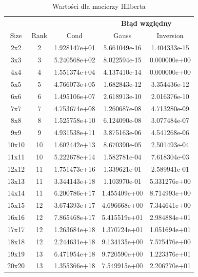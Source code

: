\documentclass[12pt]{article}
\begin{document}
\newpage
\begin{table}[!h]
\small
\centering
    \label{tab:table2}
    \begin{tabular}{|c|c|c|c|c|}
    		\hline
		\multicolumn{3}{|c|}{} & \multicolumn{2}{c|}{Błąd względny}\\
		\hline
		Size & Rank & Cond & Gauss & Inversion\\
\hline
2x2 & 2 & 1.928147e+01 & 5.661049e-16 & 1.404333e-15\\
\hline
3x3 & 3 & 5.240568e+02 & 8.022594e-15 & 0.000000e+00\\
\hline
4x4 & 4 & 1.551374e+04 & 4.137410e-14 & 0.000000e+00\\
\hline
5x5 & 5 & 4.766073e+05 & 1.682843e-12 & 3.354436e-12\\
\hline
6x6 & 6 & 1.495106e+07 & 2.618913e-10 & 2.016376e-10\\
\hline
7x7 & 7 & 4.753674e+08 & 1.260687e-08 & 4.713280e-09\\
\hline
8x8 & 8 & 1.525758e+10 & 6.124090e-08 & 3.077484e-07\\
\hline
9x9 & 9 & 4.931538e+11 & 3.875163e-06 & 4.541268e-06\\
\hline
10x10 & 10 & 1.602442e+13 & 8.670390e-05 & 2.501493e-04\\
\hline
11x11 & 10 & 5.222678e+14 & 1.582781e-04 & 7.618304e-03\\
\hline
12x12 & 11 & 1.751473e+16 & 1.339621e-01 & 2.589941e-01\\
\hline
13x13 & 11 & 3.344143e+18 & 1.103970e-01 & 5.331276e+00\\
\hline
14x14 & 11 & 6.200786e+17 & 1.455409e+00 & 8.714993e+00\\
\hline
15x15 & 12 & 3.674393e+17 & 4.696668e+00 & 7.344641e+00\\
\hline
16x16 & 12 & 7.865468e+17 & 5.415519e+01 & 2.984884e+01\\
\hline
17x17 & 12 & 1.263684e+18 & 1.370724e+01 & 1.051694e+01\\
\hline
18x18 & 12 & 2.244631e+18 & 9.134135e+00 & 7.575476e+00\\
\hline
19x19 & 13 & 6.471954e+18 & 9.720590e+00 & 1.223376e+01\\
\hline
20x20 & 13 & 1.355366e+18 & 7.549915e+00 & 2.206270e+01\\
\hline
    \end{tabular}
    \caption{Wartości dla macierzy Hilberta}
\end{table}
\end{document}
